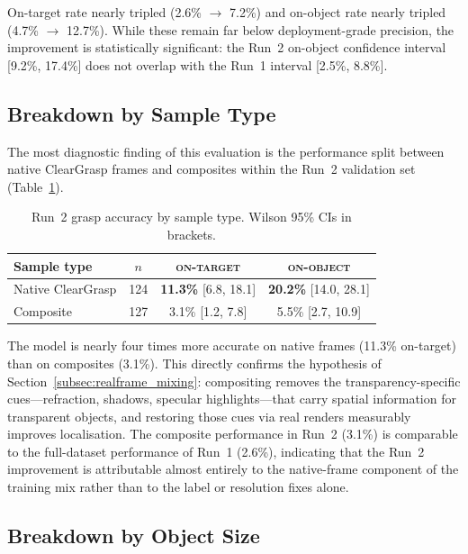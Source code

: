 On-target rate nearly tripled (2.6\% $\rightarrow$ 7.2\%) and on-object rate
nearly tripled (4.7\% $\rightarrow$ 12.7\%). While these remain far below
deployment-grade precision, the improvement is statistically significant: the
Run~2 on-object confidence interval [9.2\%, 17.4\%] does not overlap with
the Run~1 interval [2.5\%, 8.8\%].
 
\subsection{Breakdown by Sample Type}
\label{subsec:res_grasp_type}
 
The most diagnostic finding of this evaluation is the performance split
between native ClearGrasp frames and composites within the Run~2 validation
set (Table~\ref{tab:grasp_by_type}).
 
\begin{table}[htbp]
    \centering
    \caption{Run~2 grasp accuracy by sample type. Wilson 95\% CIs in brackets.}
    \label{tab:grasp_by_type}
    \begin{tabular}{lccc}
        \toprule
        \textbf{Sample type} & $n$ & \textbf{\textsc{on-target}} & \textbf{\textsc{on-object}} \\
        \midrule
        Native ClearGrasp & 124 & \textbf{11.3\%} [6.8, 18.1] & \textbf{20.2\%} [14.0, 28.1] \\
        Composite          & 127 & 3.1\% [1.2, 7.8] & 5.5\% [2.7, 10.9] \\
        \bottomrule
    \end{tabular}
\end{table}
 
The model is nearly four times more accurate on native frames (11.3\%
on-target) than on composites (3.1\%). This directly confirms the hypothesis
of Section~\ref{subsec:realframe_mixing}: compositing removes the
transparency-specific cues---refraction, shadows, specular highlights---that
carry spatial information for transparent objects, and restoring those cues
via real renders measurably improves localisation. The composite performance
in Run~2 (3.1\%) is comparable to the full-dataset performance of Run~1
(2.6\%), indicating that the Run~2 improvement is attributable almost
entirely to the native-frame component of the training mix rather than to the
label or resolution fixes alone.
 
\subsection{Breakdown by Object Size}
\label{subsec:res_grasp_size}
 
